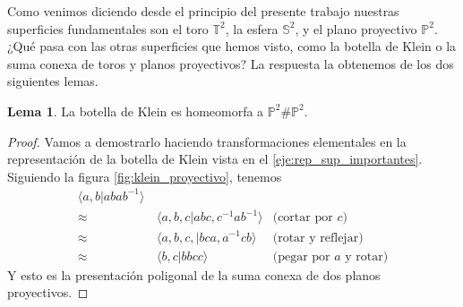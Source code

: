 \documentclass[10pt]{report}
\newcommand{\Esfera}{\mathbb{S}^2}
\newcommand{\Toro}{\mathbb{T}^2}
\newcommand{\Proyectivo}{\mathbb{P}^2}
\theoremstyle{definition}
\newtheorem{lema}[defin]{Lema}
\begin{document}
Como venimos diciendo desde el principio del presente trabajo nuestras superficies fundamentales son el toro $\Toro$, la esfera $ \Esfera$, y el plano proyectivo  $\Proyectivo$. ¿Qué pasa con las otras superficies que hemos visto, como la botella de Klein o la suma conexa de toros y planos proyectivos? La respuesta la obtenemos de los dos siguientes lemas.

\begin{lema}
La botella de Klein es homeomorfa a $\Proyectivo \# \Proyectivo$.
\end{lema}
\begin{proof}
Vamos a demostrarlo haciendo transformaciones elementales en la representación de la botella de Klein vista en el \autoref{eje:rep_sup_importantes}. 
Siguiendo la figura \autoref{fig:klein_proyectivo}, tenemos
\begin{align*}
\langle a,b| abab^{-1}\rangle & & \\
\approx & \, \langle a,b,c|abc, c^{-1}ab^{-1}\rangle &\text{(cortar por } c\text{)}\\
\approx & \, \langle a,b,c,|bca,a^{-1}cb\rangle &\text{(rotar y reflejar)}\\
\approx & \, \langle b,c|bbcc\rangle &\text{(pegar por } a \text{ y rotar)}
\end{align*}
Y esto es la presentación poligonal de la suma conexa de dos planos proyectivos.
\end{proof}
\end{document}
